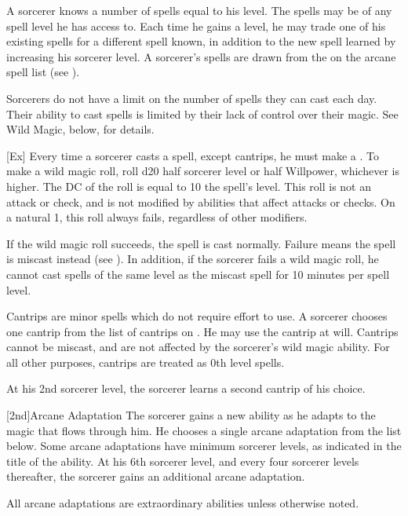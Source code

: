A sorcerer knows a number of spells equal to his level.
The spells may be of any spell level he has access to.
Each time he gains a level, he may trade one of his existing spells for a different spell known, in addition to the new spell learned by increasing his sorcerer level.
A sorcerer's spells are drawn from the  on the arcane spell list (see ).

Sorcerers do not have a limit on the number of spells they can cast each day.
Their ability to cast spells is limited by their lack of control over their magic.
See Wild Magic, below, for details.

[Ex]\label{Wild Magic}
Every time a sorcerer casts a spell, except cantrips, he must make a .
To make a wild magic roll, roll d20 \add half sorcerer level or half Willpower, whichever is higher.
The DC of the roll is equal to 10 \add the spell's level.
This roll is not an attack or check, and is not modified by abilities that affect attacks or checks.
On a natural 1, this roll always fails, regardless of other modifiers.

If the wild magic roll succeeds, the spell is cast normally.
Failure means the spell is miscast instead (see ).
In addition, if the sorcerer fails a wild magic roll, he cannot cast spells of the same level as the miscast spell for 10 minutes per spell level.

Cantrips are minor spells which do not require effort to use.
A sorcerer chooses one cantrip from the list of cantrips on .
He may use the cantrip at will.
Cantrips cannot be miscast, and are not affected by the sorcerer's wild magic ability.
For all other purposes, cantrips are treated as 0th level spells.

At his 2nd sorcerer level, the sorcerer learns a second cantrip of his choice.

[2nd]{Arcane Adaptation}
The sorcerer gains a new ability as he adapts to the magic that flows through him.
He chooses a single arcane adaptation from the list below.
Some arcane adaptations have minimum sorcerer levels, as indicated in the title of the ability.
At his 6th sorcerer level, and every four sorcerer levels thereafter, the sorcerer gains an additional arcane adaptation.

All arcane adaptations are extraordinary abilities unless otherwise noted.

